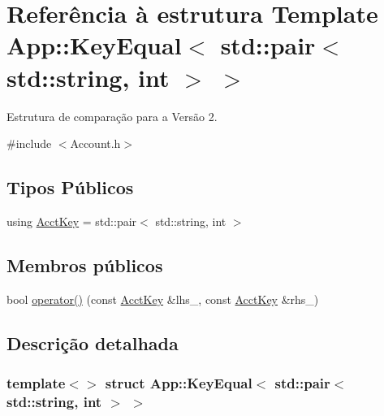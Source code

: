 \hypertarget{structApp_1_1KeyEqual_3_01std_1_1pair_3_01std_1_1string_00_01int_01_4_01_4}{}\section{Referência à estrutura Template App\+:\+:Key\+Equal$<$ std\+:\+:pair$<$ std\+:\+:string, int $>$ $>$}
\label{structApp_1_1KeyEqual_3_01std_1_1pair_3_01std_1_1string_00_01int_01_4_01_4}


Estrutura de comparação para a Versão 2.  




{\ttfamily \#include $<$Account.\+h$>$}

\subsection*{Tipos Públicos}
\begin{DoxyCompactItemize}
\item 
using \hyperlink{structApp_1_1KeyEqual_3_01std_1_1pair_3_01std_1_1string_00_01int_01_4_01_4_adad4d74d01c5e80289810a666b1880e7}{Acct\+Key} = std\+::pair$<$ std\+::string, int $>$
\end{DoxyCompactItemize}
\subsection*{Membros públicos}
\begin{DoxyCompactItemize}
\item 
bool \hyperlink{structApp_1_1KeyEqual_3_01std_1_1pair_3_01std_1_1string_00_01int_01_4_01_4_aea6094ec599a3412f2f8b768f629d4f4}{operator()} (const \hyperlink{structApp_1_1KeyEqual_3_01std_1_1pair_3_01std_1_1string_00_01int_01_4_01_4_adad4d74d01c5e80289810a666b1880e7}{Acct\+Key} \&lhs\+\_\+, const \hyperlink{structApp_1_1KeyEqual_3_01std_1_1pair_3_01std_1_1string_00_01int_01_4_01_4_adad4d74d01c5e80289810a666b1880e7}{Acct\+Key} \&rhs\+\_\+)
\end{DoxyCompactItemize}


\subsection{Descrição detalhada}
\subsubsection*{template$<$$>$\newline
struct App\+::\+Key\+Equal$<$ std\+::pair$<$ std\+::string, int $>$ $>$}


